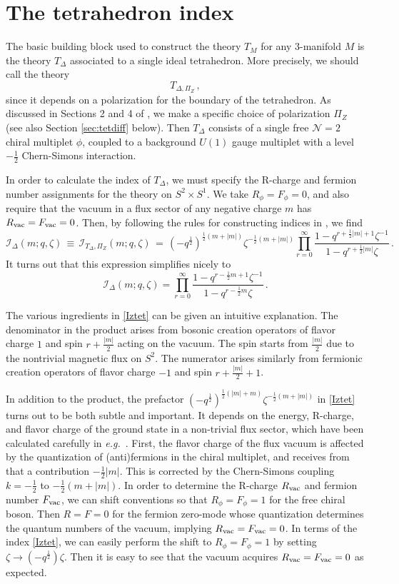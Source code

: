 \documentclass[11pt,letterpaper]{article}
\numberwithin{equation}{section}
\newcommand{\be}{\begin{equation}}
\newcommand{\ee}{\end{equation}}
\newcommand{\eg}{\emph{e.g.}}
\newcommand{\CI}{\mathcal{I}}
\newcommand{\CN}{\mathcal{N}}
\newcommand{\q}{q}
\begin{document}
\section{The tetrahedron index}
\label{sec:T1}

The basic building block used to construct the theory $T_M$ for any 3-manifold $M$ is the theory $T_\Delta$ associated to a single ideal tetrahedron. More precisely, we should call the theory
%
\be T_{\Delta,\Pi_Z}\,, \label{tetthy} \ee
%
since it depends on a polarization for the boundary of the tetrahedron. As discussed in Sections 2 and 4 of \cite{DGG}, we make a specific choice of polarization $\Pi_Z$ (see also Section \ref{sec:tetdiff} below). Then $T_\Delta$ consists of a single free $\CN=2$ chiral multiplet $\phi$, coupled to a background $U(1)$ gauge multiplet with a level $-\tfrac12$ Chern-Simons interaction.

In order to calculate the index of $T_\Delta$, we must specify the R-charge and fermion number assignments for the theory on $S^2\times S^1$. We take $R_\phi=F_\phi=0$, and also require that the vacuum in a flux sector of any negative charge $m$ has $R_{\rm vac}=F_{\rm vac}=0$. Then, by following the rules for constructing indices in \cite{KW-index, IY-index}, we find
%
\be \CI_\Delta(m;q,\zeta) \,\equiv\, \CI_{T_\Delta,\Pi_Z}(m;q,\zeta) \,=\,  (-\q^{\frac12})^{\frac12(m+|m|)}\zeta^{-\frac12(m+|m|)} \prod_{r=0}^\infty \frac{1- \q^{r+\frac12|m|+1}\zeta^{-1}}{1-\q^{r+\frac12|m|}\zeta}\,. \label{Iztet} \ee
%
It turns out that this expression simplifies nicely to
%
\be \CI_\Delta(m;q,\zeta) =\prod_{r=0}^\infty \frac{1- \q^{r-\frac12m+1}\zeta^{-1}}{1-\q^{r-\frac12m}\zeta}\,. \label{Iztet2} \ee


The various ingredients in \eqref{Iztet} can be given an intuitive explanation. The denominator in the product arises from bosonic creation operators of flavor charge $1$ and spin $r+\tfrac{|m|}{2}$ acting on the vacuum. The spin starts from $\tfrac{|m|}{2}$ due to the nontrivial magnetic flux on $S^2$. The numerator arises similarly from fermionic creation operators of flavor charge $-1$ and spin $r+\tfrac{|m|}{2}+1$.

In addition to the product, the prefactor $(-\q^{\frac12})^{\frac12(|m|+m)}\zeta^{-\frac12(m+|m|)}$ in \eqref{Iztet} turns out to be both subtle and important. It depends on the energy, R-charge, and flavor charge of the ground state in a non-trivial flux sector, which have been calculated carefully in \eg\ \cite{BKW-monopoles}. First, the flavor charge of the flux vacuum is affected by the quantization of (anti)fermions in the chiral multiplet, and receives from that a contribution $-\tfrac12|m|$. This is corrected by the Chern-Simons coupling $k=-\tfrac12$ to $-\tfrac12(m+|m|)$. In order to determine the R-charge $R_{\rm vac}$ and fermion number $F_{\rm vac}$, we can shift conventions so that $R_\phi=F_\phi=1$ for the free chiral boson. Then $R=F=0$ for the fermion zero-mode whose quantization determines the quantum numbers of the vacuum, implying $R_{\rm vac}=F_{\rm vac}=0$. In terms of the index \eqref{Iztet}, we can easily perform the shift to $R_\phi=F_\phi=1$ by setting $\zeta\to (-\q^{\frac12})\zeta$. Then it is easy to see that the vacuum acquires $R_{\rm vac}=F_{\rm vac}=0$ as expected.
\end{document}
